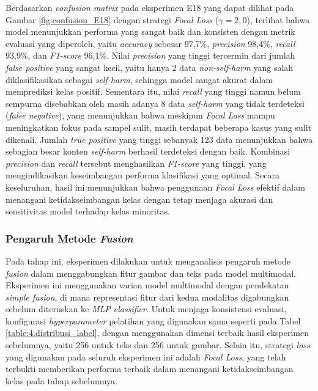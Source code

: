 Berdasarkan \textit{confusion matrix} pada eksperimen E18 yang dapat dilihat pada Gambar \ref{fig:confusion_E18} dengan strategi \textit{Focal Loss} ($\gamma = 2{,}0$), terlihat bahwa model menunjukkan performa yang sangat baik dan konsisten dengan metrik evaluasi yang diperoleh, yaitu \textit{accuracy} sebesar 97,7\%, \textit{precision} 98,4\%, \textit{recall} 93,9\%, dan \textit{F1-score} 96,1\%. Nilai \textit{precision} yang tinggi tercermin dari jumlah \textit{false positive} yang sangat kecil, yaitu hanya 2 data \textit{non-self-harm} yang salah diklasifikasikan sebagai \textit{self-harm}, sehingga model sangat akurat dalam memprediksi kelas positif. Sementara itu, nilai \textit{recall} yang tinggi namun belum sempurna disebabkan oleh masih adanya 8 data \textit{self-harm} yang tidak terdeteksi (\textit{false negative}), yang menunjukkan bahwa meskipun \textit{Focal Loss} mampu meningkatkan fokus pada sampel sulit, masih terdapat beberapa kasus yang sulit dikenali. Jumlah \textit{true positive} yang tinggi sebanyak 123 data menunjukkan bahwa sebagian besar konten \textit{self-harm} berhasil terdeteksi dengan baik. Kombinasi \textit{precision} dan \textit{recall} tersebut menghasilkan \textit{F1-score} yang tinggi, yang mengindikasikan keseimbangan performa klasifikasi yang optimal. Secara keseluruhan, hasil ini menunjukkan bahwa penggunaan \textit{Focal Loss} efektif dalam menangani ketidakseimbangan kelas dengan tetap menjaga akurasi dan sensitivitas model terhadap kelas minoritas.


\subsubsection{Pengaruh Metode \textit{Fusion}} \label{IV.MultimodalFusion}
Pada tahap ini, eksperimen dilakukan untuk menganalisis pengaruh metode \textit{fusion} dalam menggabungkan fitur gambar dan teks pada model multimodal. Eksperimen ini menggunakan varian model multimodal dengan pendekatan \textit{simple fusion}, di mana representasi fitur dari kedua modalitas digabungkan sebelum diteruskan ke \textit{MLP classifier}. Untuk menjaga konsistensi evaluasi, konfigurasi \textit{hyperparameter} pelatihan yang digunakan sama seperti pada Tabel \ref{table:4.distribusi_label}, dengan menggunakan dimensi terbaik hasil eksperimen sebelumnya, yaitu 256 untuk teks dan 256 untuk gambar. Selain itu, strategi \textit{loss} yang digunakan pada seluruh eksperimen ini adalah \textit{Focal Loss}, yang telah terbukti memberikan performa terbaik dalam menangani ketidakseimbangan kelas pada tahap sebelumnya.

